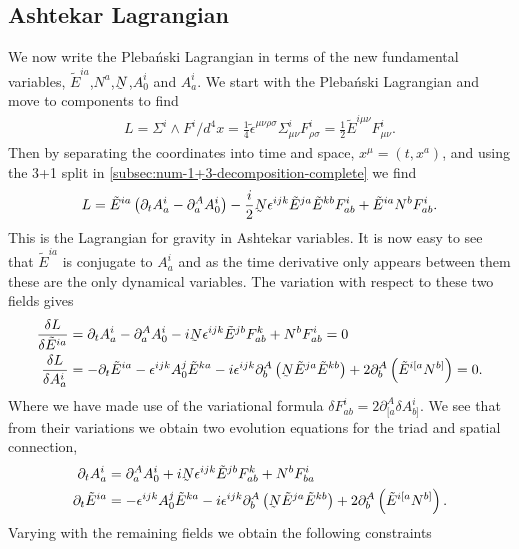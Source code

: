 \documentclass[10pt]{report}
\newcommand{\pleb}[0]{Pleba\'nski}
\newcommand{\utilde}[1]{\underaccent{\tilde}{#1}}
\theoremstyle{definition}
\newcommand{\teps}[0]{\tilde{\epsilon}}
\newcommand{\tE}[0]{\tilde{E}}
\newcommand{\dlap}[0]{\utilde{N}}
\begin{document}
    \subsection{Ashtekar Lagrangian}
    We now write the \pleb{} Lagrangian in terms of the new fundamental variables, $\tE^{ia}$,$N^a$,$\dlap$,$A^i_0$ and $A^i_a$. We start with the \pleb{} Lagrangian and move to components to find
    \begin{align}
        L = \Sigma^i \wedge F^i /d^4x = \frac{1}{4} \teps^{\mu\nu\rho\sigma} \Sigma^i_{\mu\nu} F^i_{\rho\sigma} = \frac{1}{2} \tE^{i\mu\nu} F^i_{\mu\nu}.
    \end{align}
    Then by separating the coordinates into time and space, $x^\mu = (t,x^a)$, and using the 3+1 split in \cref{subsec:num-1+3-decomposition-complete} we find 
    \begin{align}
        L = \tE^{ia} \left( \partial_t A^i_a - \partial^A_a A^i_0 \right) -\frac{i}{2} \dlap \epsilon^{ijk} \tE^{ja} \tE^{kb} F^i_{ab} + \tE^{ia} N^b F^i_{ab}.
    \end{align}
    This is the Lagrangian for gravity in Ashtekar variables. It is now easy to see that $\tE^{ia}$ is conjugate to $A^i_a$ and as the time derivative only appears between them these are the only dynamical variables. The variation with respect to these two fields gives
    \begin{align}
        \frac{\delta L}{\delta \tE^{ia}} &= \partial_t A^i_a - \partial^A_a A^i_0 - i \dlap \epsilon^{ijk} \tE^{jb} F^k_{ab} + N^b F^i_{ab} = 0 \\
        \frac{\delta L}{\delta A^i_a} &= -\partial_t \tE^{ia} - \epsilon^{ijk} A^j_0 \tE^{ka} - i \epsilon^{ijk} \partial_b^A \left( \dlap \tE^{ja} \tE^{kb} \right) + 2 \partial_b^A \left( \tE^{i[a} N^{b]} \right) = 0.
    \end{align}
    Where we have made use of the variational formula $\delta F^i_{ab} = 2\partial^A_{[a} \delta A^i_{b]}$. We see that from their variations we obtain two evolution equations for the triad and spatial connection,
    \begin{align}
        \partial_t A^i_a  &= \partial^A_a A^i_0 + i \dlap \epsilon^{ijk} \tE^{jb} F^k_{ab} + N^b F^i_{ba} \\
        \partial_t \tE^{ia} &= - \epsilon^{ijk} A^j_0 \tE^{ka} - i \epsilon^{ijk} \partial_b^A \left( \dlap \tE^{ja} \tE^{kb} \right) + 2 \partial_b^A \left( \tE^{i[a} N^{b]} \right). \label{eq:num-ashtekar-triad-evolution-equation}
    \end{align}
    Varying with the remaining fields we obtain the following constraints
\end{document}
